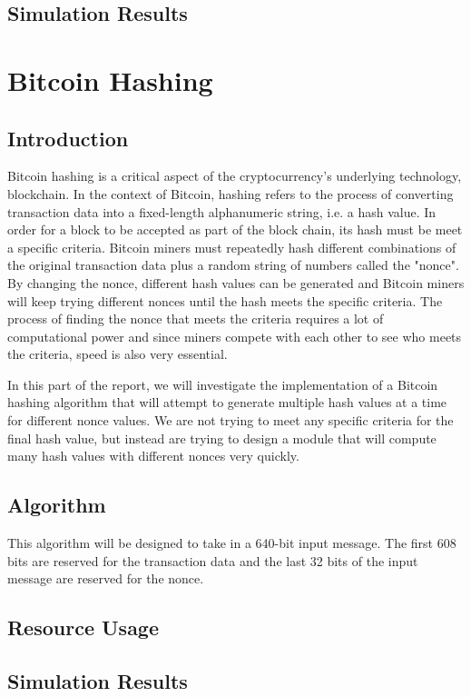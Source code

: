 \documentclass{article}
\begin{document}



\subsection{Simulation Results}


\newpage
\section{Bitcoin Hashing}

\subsection{Introduction}


Bitcoin hashing is a critical aspect of the cryptocurrency's underlying technology, blockchain. In the context of Bitcoin, hashing refers to the process of converting transaction data into a fixed-length alphanumeric string, i.e. a hash value. In order for a block to be accepted as part of the block chain, its hash must be meet a specific criteria. Bitcoin miners must repeatedly hash different combinations of the original transaction data plus a random string of numbers called the "nonce". By changing the nonce, different hash values can be generated and Bitcoin miners will keep trying different nonces until the hash meets the specific criteria. The process of finding the nonce that meets the criteria requires a lot of computational power and since miners compete with each other to see who meets the criteria, speed is also very essential.

In this part of the report, we will investigate the implementation of a Bitcoin hashing algorithm that will attempt to generate multiple hash values at a time for different nonce values. We are not trying to meet any specific criteria for the final hash value, but instead are trying to design a module that will compute many hash values with different nonces very quickly.

\subsection{Algorithm}

This algorithm will be designed to take in a 640-bit input message. The first 608 bits are reserved for the transaction data and the last 32 bits of the input message are reserved for the nonce.

\subsection{Resource Usage}


\subsection{Simulation Results}



\label{LastPage}
\end{document}
